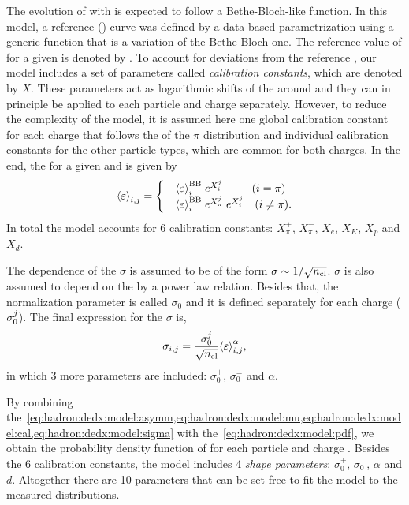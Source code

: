 The evolution of \meaneps with \pp is expected to follow
a Bethe-Bloch-like function. In this model, a reference
\meaneps(\pp) curve was defined by a data-based
parametrization using a generic function that is a
variation of the Bethe-Bloch one. The reference value
of \meaneps for a given \pp is denoted by \meanepsbb.
To account for deviations from the reference \meaneps,
our model includes a set of parameters called
\textit{calibration constants}, which are denoted by $X$.
These parameters act as logarithmic shifts of the \meaneps
around \meanepsbb and they can in principle be applied
to each particle and charge separately. However, to reduce the complexity
of the model, it is assumed here one global calibration constant
for each charge that follows the \meaneps of the $\pi$ distribution
and individual calibration constants for the other particle types,
which are common for both charges. In the end, the \meaneps for a
given \ipart and \ich is given by
\begin{equation}
  \meaneps_{\ipart,\ich} =
  \begin{cases}
    & \meaneps_{\ipart}^\text{BB} \; e^{X_{\ipart}^{\ich}} \ \ \ \ \ \ \ \ (i=\pi) \\
    & \meaneps_{\ipart}^\text{BB} \; e^{X_{\pi}^{\ich}} \; e^{X_{\ipart}^{\ich}} \ \ \ (i\neq\pi).
  \end{cases}
  \label{eq:hadron:dedx:model:cal}
\end{equation}
In total the model accounts for 6 calibration constants:
$X_{\pi}^{+}$, $X_{\pi}^{-}$, $X_{e}$, $X_{K}$, $X_{p}$ and $X_{d}$.

The \ncl dependence of the $\sigma$ is assumed to be of the form
$\sigma \sim 1/\sqrt{\mbox{$n_{\text{cl}}$}}$. $\sigma$ is also assumed to depend
on the \meaneps by a power law relation. Besides that,
the normalization parameter is called
$\sigma_0$ and it is defined separately for each charge ($\sigma_0^{j}$).
The final expression for the $\sigma$ is,
\begin{equation}
  \sigma_{i,j} = \frac{\sigma_0^{j}}{\sqrt{\mbox{$n_{\text{cl}}$}}} \mbox{$\langle\varepsilon\rangle$}_{i,j}^{\alpha},
  \label{eq:hadron:dedx:model:sigma}
\end{equation}
in which 3 more parameters are included: $\sigma_0^+$, $\sigma_0^-$ and $\alpha$. 

By combining
the~\cref{eq:hadron:dedx:model:asymm,eq:hadron:dedx:model:mu,eq:hadron:dedx:model:cal,eq:hadron:dedx:model:sigma}
with the~\cref{eq:hadron:dedx:model:pdf}, we obtain the probability density
function of \eps for each particle \ipart and charge \ich. Besides the 6 calibration constants,
the model includes 4 \textit{shape parameters}: $\sigma_0^+$, $\sigma_0^-$, $\alpha$ and $d$.
Altogether there are 10 parameters that can be set free to fit the model
to the measured \eps distributions.


